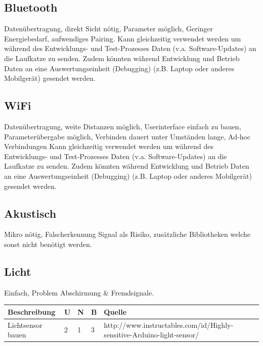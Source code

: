 \documentclass[a4paper]{report}
\begin{document}
\subsection{Bluetooth}
\label{app:ssec:BT}
Datenübertragung, direkt Sicht nötig, Parameter möglich, Geringer Energiebedarf, aufwendiges Pairing.
Kann gleichzeitig verwendet werden um während des Entwicklungs- und Test-Prozesses Daten (v.a. Software-Updates) an die Laufkatze zu senden. Zudem könnten während Entwicklung und Betrieb Daten an eine Auswertungseinheit (Debugging) (z.B. Laptop oder anderes Mobilgerät) gesendet werden.

\subsection{WiFi}
\label{app:ssec:WLAN}
Datenübertragung, weite Distanzen möglich, Userinterface einfach zu bauen, Parameterübergabe möglich, Verbinden dauert unter Umständen lange, Ad-hoc Verbindungen
Kann gleichzeitig verwendet werden um während des Entwicklungs- und Test-Prozesses Daten (v.a. Software-Updates) an die Laufkatze zu senden. Zudem könnten während Entwicklung und Betrieb Daten an eine Auswertungseinheit (Debugging) (z.B. Laptop oder anderes Mobilgerät) gesendet werden.

\subsection{Akustisch}
\label{app:ssec:Sonic}
Mikro nötig, Falscherkennung Signal als Risiko, zusätzliche Bibliotheken welche sonst nicht benötigt werden.

\subsection{Licht}
\label{app:ssec:FiatLux}
Einfach, Problem Abschirmung \& Fremdsignale.

\vspace{1em}
\noindent
\begin{tabular}{|p{}|p{}|p{}|p{}|p{}|}
	\hline
	\textbf{Beschreibung} & \textbf{U} & \textbf{N} & \textbf{B} & \textbf{Quelle} \\
	\hline
	Lichtsensor bauen & 2 & 1 & 3 & http://www.instructables.com/id/Highly-sensitive-Arduino-light-sensor/ \\
	\hline
\end{tabular}
\end{document}
